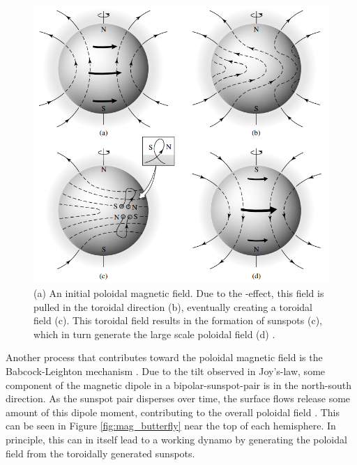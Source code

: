 \documentclass[11pt,a4paper,onecolumn]{report}
\begin{document}
\begin{figure}[t]
  \centering
  \includegraphics[width=0.6\linewidth]{dynamo.png}
  \caption{(a) An initial poloidal magnetic field. Due to the
  \textomega-effect, this field is pulled in the toroidal direction (b),
  eventually creating a toroidal field (c). This toroidal field results in the
  formation of sunspots (c), which in turn generate the large scale poloidal field
  (d) \citep{carroll2006}.}
  \label{fig:dynamo}
\end{figure}


Another process that contributes toward the poloidal magnetic field is the
Babcock-Leighton mechanism
\citep{babcock_topology_1961,leighton_transport_1964}. Due to the tilt observed
in Joy's-law, some component of the magnetic dipole in a bipolar-sunspot-pair is
in the north-south direction. As the sunspot pair disperses over time, the
surface flows release some amount of this dipole moment, contributing to the
overall poloidal field . This can be seen in Figure \ref{fig:mag_butterfly}
near the top of each hemisphere. In principle, this can in itself lead to a
working dynamo by generating the poloidal field from the toroidally generated
sunspots. \\
\end{document}
